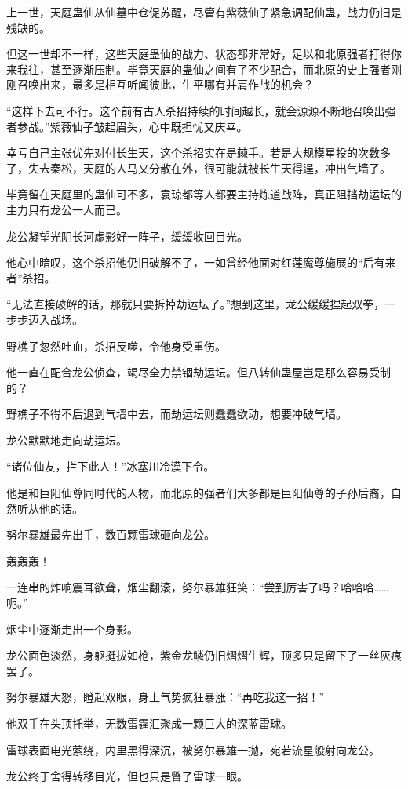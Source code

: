 \begin{this_body}
上一世，天庭蛊仙从仙墓中仓促苏醒，尽管有紫薇仙子紧急调配仙蛊，战力仍旧是残缺的。

但这一世却不一样，这些天庭蛊仙的战力、状态都非常好，足以和北原强者打得你来我往，甚至逐渐压制。毕竟天庭的蛊仙之间有了不少配合，而北原的史上强者刚刚召唤出来，最多是相互听闻彼此，生平哪有并肩作战的机会？

“这样下去可不行。这个前有古人杀招持续的时间越长，就会源源不断地召唤出强者参战。”紫薇仙子皱起眉头，心中既担忧又庆幸。

幸亏自己主张优先对付长生天，这个杀招实在是棘手。若是大规模星投的次数多了，失去秦松，天庭的人马又分散在外，很可能就被长生天得逞，冲出气墙了。

毕竟留在天庭里的蛊仙可不多，袁琼都等人都要主持炼道战阵，真正阻挡劫运坛的主力只有龙公一人而已。

龙公凝望光阴长河虚影好一阵子，缓缓收回目光。

他心中暗叹，这个杀招他仍旧破解不了，一如曾经他面对红莲魔尊施展的“后有来者”杀招。

“无法直接破解的话，那就只要拆掉劫运坛了。”想到这里，龙公缓缓捏起双拳，一步步迈入战场。

野樵子忽然吐血，杀招反噬，令他身受重伤。

他一直在配合龙公侦查，竭尽全力禁锢劫运坛。但八转仙蛊屋岂是那么容易受制的？

野樵子不得不后退到气墙中去，而劫运坛则蠢蠢欲动，想要冲破气墙。

龙公默默地走向劫运坛。

“诸位仙友，拦下此人！”冰塞川冷漠下令。

他是和巨阳仙尊同时代的人物，而北原的强者们大多都是巨阳仙尊的子孙后裔，自然听从他的话。

努尔暴雄最先出手，数百颗雷球砸向龙公。

轰轰轰！

一连串的炸响震耳欲聋，烟尘翻滚，努尔暴雄狂笑：“尝到厉害了吗？哈哈哈……呃。”

烟尘中逐渐走出一个身影。

龙公面色淡然，身躯挺拔如枪，紫金龙鳞仍旧熠熠生辉，顶多只是留下了一丝灰痕罢了。

努尔暴雄大怒，瞪起双眼，身上气势疯狂暴涨：“再吃我这一招！”

他双手在头顶托举，无数雷霆汇聚成一颗巨大的深蓝雷球。

雷球表面电光萦绕，内里黑得深沉，被努尔暴雄一抛，宛若流星般射向龙公。

龙公终于舍得转移目光，但也只是瞥了雷球一眼。


\end{this_body}
